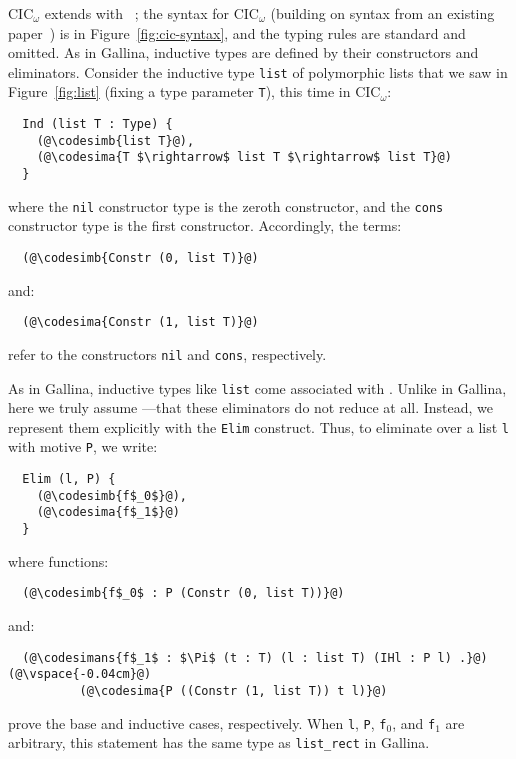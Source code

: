 CIC$_{\omega}$ extends  with ~\cite{inductive};
the syntax for CIC$_{\omega}$ (building on syntax from an existing paper~\cite{Timany2015FirstST}) is in Figure~\ref{fig:cic-syntax},
and the typing rules are standard and omitted.
As in Gallina, inductive types are defined by their constructors and eliminators.
Consider the inductive type \lstinline{list} of polymorphic lists that we saw in Figure~\ref{fig:list} (fixing a type parameter \lstinline{T}),
this time in CIC$_{\omega}$: %

\begin{lstlisting}
  Ind (list T : Type) {
    (@\codesimb{list T}@),
    (@\codesima{T $\rightarrow$ list T $\rightarrow$ list T}@)
  }
\end{lstlisting}
where the \lstinline{nil} constructor type is the zeroth constructor, and the \lstinline{cons} constructor type is the first constructor.
Accordingly, the terms:

\begin{lstlisting}
  (@\codesimb{Constr (0, list T)}@)
\end{lstlisting}
and:

\begin{lstlisting}
  (@\codesima{Constr (1, list T)}@)
\end{lstlisting}
refer to the constructors \lstinline{nil} and \lstinline{cons}, respectively.

As in Gallina, inductive types like \lstinline{list} come associated with .
Unlike in Gallina, here we truly assume ---that these eliminators
do not reduce at all.
Instead, we represent them explicitly with the \lstinline{Elim} construct.
Thus, to eliminate over a list \lstinline{l} with motive \lstinline{P},
we write: %

\begin{lstlisting}
  Elim (l, P) {
    (@\codesimb{f$_0$}@),
    (@\codesima{f$_1$}@)
  }
\end{lstlisting}
where functions:

\begin{lstlisting}
  (@\codesimb{f$_0$ : P (Constr (0, list T))}@)
\end{lstlisting}
and:

\begin{lstlisting}
  (@\codesimans{f$_1$ : $\Pi$ (t : T) (l : list T) (IHl : P l) .}@)(@\vspace{-0.04cm}@)
          (@\codesima{P ((Constr (1, list T)) t l)}@)
\end{lstlisting}
prove the base and inductive cases, respectively.
When \lstinline{l}, \lstinline{P}, \lstinline{f}$_0$, and \lstinline{f}$_1$ are arbitrary,
this statement has the same type as \lstinline{list_rect} in Gallina.

